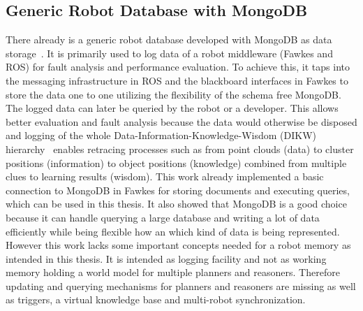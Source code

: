 \documentclass[a4paper,11pt]{article}
\begin{document}
\subsection{Generic Robot Database with MongoDB}
\label{sec:mongo-logging}
There already is a generic robot database developed with MongoDB as
data storage~\cite{RoboDB}. It is primarily used to log data of a
robot middleware (Fawkes and ROS) for fault analysis and performance
evaluation. To achieve this, it taps into the messaging infrastructure
in ROS and the blackboard interfaces in Fawkes to store the data one
to one utilizing the flexibility of the schema free MongoDB. The
logged data can later be queried by the robot or a developer. This
allows better evaluation and fault analysis because the data would
otherwise be disposed and logging of the whole
Data-Information-Knowledge-Wisdom (DIKW) hierarchy~\cite{DIKW} enables
retracing processes such as from point clouds (data) to cluster
positions (information) to object positions (knowledge) combined from
multiple clues to learning results (wisdom). This work already
implemented a basic connection to MongoDB in Fawkes for storing
documents and executing queries, which can be used in this thesis. It
also showed that MongoDB is a good choice because it can handle
querying a large database and writing a lot of data efficiently while
being flexible how an which kind of data is being represented.
However this work lacks some important concepts needed for a robot
memory as intended in this thesis. It is intended as logging facility
and not as working memory holding a world model for multiple planners
and reasoners. Therefore updating and querying mechanisms for planners
and reasoners are missing as well as triggers, a virtual knowledge
base and multi-robot synchronization.
\end{document}
